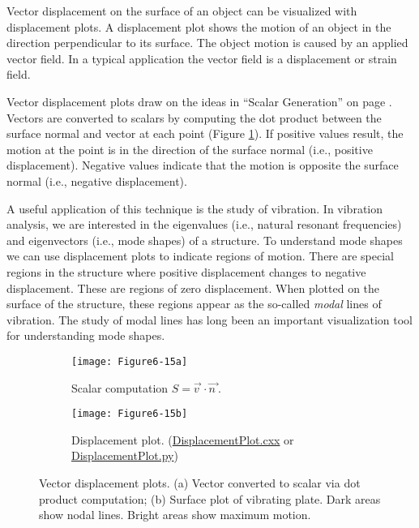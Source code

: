Vector displacement on the surface of an object can be visualized with displacement plots. A displacement plot shows the motion of an object in the direction perpendicular to its surface. The object motion is caused by an applied vector field. In a typical application the vector field is a displacement or strain field.

Vector displacement plots draw on the ideas in ``Scalar Generation'' on  page \pageref{subsec:scalar_generation}. Vectors are converted to scalars by computing the dot product between the surface normal and vector at each point (Figure \ref{fig:Figure6-15a}). If positive values result, the motion at the point is in the direction of the surface normal (i.e., positive displacement). Negative values indicate that the motion is opposite the surface normal (i.e., negative displacement).

A useful application of this technique is the study of vibration. In vibration analysis, we are interested in the eigenvalues (i.e., natural resonant frequencies) and eigenvectors (i.e., mode shapes) of a structure. To understand mode shapes we can use displacement plots to indicate regions of motion. There are special regions in the structure where positive displacement changes to negative displacement. These are regions of zero displacement. When plotted on the surface of the structure, these regions appear as the so-called \emph{modal} lines of vibration. The study of modal lines has long been an important visualization tool for understanding mode shapes.

\begin{figure}[htb]
	\begin{subfigure}[h]{0.48\linewidth}
		\texttt{[image: Figure6-15a]}
		\caption{Scalar computation $S = \overrightarrow{v\ } \cdot \overrightarrow{n\ }$.}\label{fig:Figure6-15a}
	\end{subfigure}
	\hfill
	\begin{subfigure}[h]{0.48\linewidth}
		\texttt{[image: Figure6-15b]}
		\caption{Displacement plot. (\href{https://lorensen.github.io/VTKExamples/site/Cxx/VisualizationAlgorithms/DisplacementPlot}{DisplacementPlot.cxx} or \href{https://lorensen.github.io/VTKExamples/site/Python/VisualizationAlgorithms/DisplacementPlot/}{DisplacementPlot.py})}\label{fig:Figure6-15b}
	\end{subfigure}
	\caption{Vector displacement plots. (a) Vector converted to scalar via dot product computation; (b) Surface plot of vibrating plate. Dark areas show nodal lines. Bright areas show maximum motion.}\label{fig:Figure6-15}
\end{figure}

